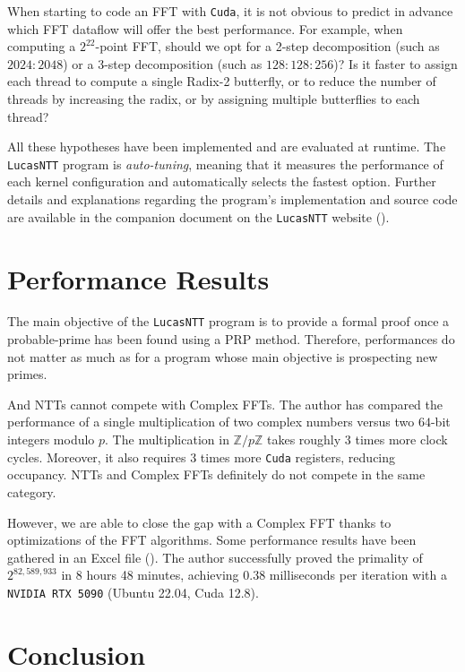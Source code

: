 \documentclass{article}
\begin{document}
When starting to code an FFT with \texttt{Cuda}, it is not obvious to predict in advance which FFT dataflow will offer the best performance. For example, when computing a $2^{22}$-point FFT, should we opt for a 2-step decomposition (such as $2024:2048$) or a 3-step decomposition (such as $128:128:256$)? Is it faster to assign each thread to compute a single Radix-2 butterfly, or to reduce the number of threads by increasing the radix, or by assigning multiple butterflies to each thread? 

All these hypotheses have been implemented and are evaluated at runtime. The \texttt{LucasNTT} program is \emph{auto-tuning}, meaning that it measures the performance of each kernel configuration and automatically selects the fastest option. Further details and explanations regarding the program's implementation and source code are available in the companion document on the \texttt{LucasNTT} website (\cite{LucasNTT_documents}).

\section{Performance Results}

The main objective of the \texttt{LucasNTT} program is to provide a formal proof once a probable-prime has been found using a PRP method. Therefore, performances do not matter as much as for a program whose main objective is prospecting new primes.

And NTTs cannot compete with Complex FFTs. The author has compared the performance of a single multiplication of two complex numbers versus two $64$-bit integers modulo $p$. The multiplication in $\mathbb{Z}/p\mathbb{Z}$ takes roughly $3$ times more clock cycles. Moreover, it also requires $3$ times more \texttt{Cuda} registers, reducing occupancy. NTTs and Complex FFTs definitely do not compete in the same category.

However, we are able to close the gap with a Complex FFT thanks to optimizations of the FFT algorithms. Some performance results have been gathered in an Excel file (\cite{LucasNTT_FFT_Lengths}). The author successfully proved the primality of $2^{82,589,933}$ in 8 hours 48 minutes, achieving $0.38$ milliseconds per iteration with a \texttt{NVIDIA RTX 5090} (Ubuntu 22.04, Cuda 12.8). 

\section{Conclusion}
\end{document}
